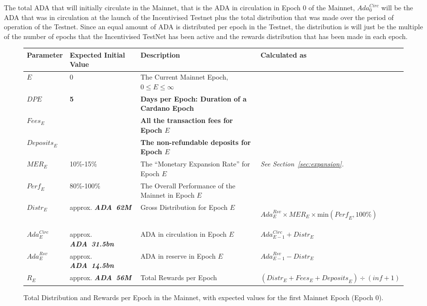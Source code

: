 \documentclass[11pt,a4paper,dvipsnames,twosided,final]{article}
\newcommand{\ada}{ADA{}}
\newcommand{\ADA}[1]{\textbf{\emph{\ada~{#1}}}}
\newcommand{\cardano}[1]{Cardano}
\begin{document}
\noindent
The total \ada{} that will initially circulate in the Mainnet, that is the \ada{} in circulation in Epoch 0 of the Mainnet,
$\textit{Ada}^{\textit{Circ}}_{0}$ will be the \ada{} that was in circulation at the launch of the Incentivised
Testnet plus the total distribution that was made over the period of operation of the Testnet.
Since an equal amount of \ada{} is distributed per epoch in
the Testnet,
the distribution is will just be the multiple of the number of epochs that the Incentivised TestNet has
been active and the rewards distribution that has been made in each epoch.


\begin{figure}[h!]
\begin{center}
\begin{tabular}{||l|p{2.4cm}|p{6cm}|p{3.9cm}||}
  \hline \hline
\textbf{Parameter} & \textbf{Expected Initial Value} & \textbf{Description} & \textbf{Calculated as} \\\hline
$\textit{E}$ & $0$ & The Current Mainnet Epoch, $0 \le E \le \infty$ & \\\hline
\textbf{\color{green} $\textit{DPE}$} & \textbf{\color{green} 5} & \textbf{\color{green} Days per Epoch: Duration of a \cardano{} Epoch} & \\\hline
\textbf{\color{cyan} $\textit{Fees}_E$} & & \textbf{\color{cyan} All the transaction fees for Epoch $E$} & \\\hline
\textbf{\color{cyan} $\textit{Deposits}_E$} & & \textbf{\color{cyan} The non-refundable deposits for Epoch $E$} & \\\hline
$\textit{MER}_E$ & 10\%-15\% &  The ``Monetary Expansion Rate'' for Epoch $E$ & \emph{See Section~\ref{sec:expansion}.} \\\hline
$\textit{Perf}_E$ & 80\%-100\% &  The Overall Performance of the Mainnet in Epoch $E$ &  \\\hline
$\textit{Distr}_E$ & approx. \ADA{62M} & Gross Distribution for Epoch $E$ & \begin{flushleft}$\textit{Ada}^{\textit{Rsv}}_E \times \textit{MER}_E \times \textrm{min}(\textit{Perf}_E, 100\%)$ \end{flushleft} \\\hline
$\textit{Ada}^{\textit{Circ}}_E$ & approx. \ADA{31.5bn}  & \ada{} in circulation in Epoch $E$ & $\textit{Ada}^{\textit{Circ}}_{E-1} + \textit{Distr}_E$ \\\hline
$\textit{Ada}^{\textit{Rsv}}_E$ & approx. \ADA{14.5bn} & \ada{} in reserve in Epoch $E$ & $\textit{Ada}^{\textit{Rsv}}_{E-1} - \textit{Distr}_E$ \\\hline
$R_E$ & approx. \ADA{56M} & Total Rewards per Epoch & $ (\textit{Distr}_E + \textit{Fees}_E + \textit{Deposits}_E) \div (\textit{inf}+1)$ \\\hline
  \hline
\end{tabular}
\end{center}
\caption{Total Distribution and Rewards per Epoch in the Mainnet, with expected values for the first Mainnet Epoch (Epoch 0).}
\end{figure}
\end{document}
